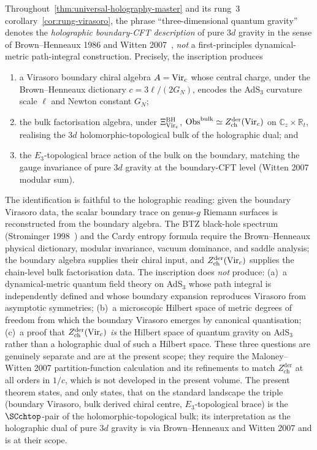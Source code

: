 \begin{remark}
Throughout~\cref{thm:universal-holography-master} and its
rung~3 corollary~\cref{cor:rung-virasoro}, the phrase
``three-dimensional quantum gravity'' denotes the
\emph{holographic boundary-CFT description} of pure $3d$
gravity in the sense of Brown--Henneaux 1986
\cite{BrownHenneaux} and Witten 2007~\cite{Witten2007},
\emph{not} a first-principles dynamical-metric path-integral
construction. Precisely, the inscription produces
\begin{enumerate}
\item[(i)] a Virasoro boundary chiral algebra
 $A = \mathrm{Vir}_{c}$ whose central charge, under the
 Brown--Henneaux dictionary $c = 3\ell/(2G_{N})$, encodes the
 AdS$_{3}$ curvature scale $\ell$ and Newton constant $G_{N}$;
\item[(ii)] the bulk factorisation algebra, under
 \(\Xi_{\mathrm{Vir}_c}^{\mathrm{BH}}\),
 $\mathrm{Obs}^{\mathrm{bulk}} \simeq
 Z^{\mathrm{der}}_{\mathrm{ch}}(\mathrm{Vir}_{c})$ on
 $\mathbb{C}_{z} \times \mathbb{R}_{t}$, realising the
 $3d$ holomorphic-topological bulk of the holographic dual; and
\item[(iii)] the $E_{3}$-topological brace action of the bulk
 on the boundary, matching the gauge invariance of pure $3d$
 gravity at the boundary-CFT level (Witten 2007 modular sum).
\end{enumerate}
The identification is faithful to the holographic reading:
given the boundary Virasoro data, the scalar boundary trace on
genus-$g$ Riemann surfaces is reconstructed from the boundary
algebra. The BTZ black-hole spectrum
(Strominger 1998~\cite{StromingerBTZ}) and the Cardy entropy
formula require the Brown--Henneaux physical dictionary, modular
invariance, vacuum dominance, and saddle analysis; the boundary
algebra supplies their chiral input, and
$Z^{\mathrm{der}}_{\mathrm{ch}}(\mathrm{Vir}_{c})$ supplies the
chain-level bulk factorisation data. The inscription does
\emph{not} produce: (a)~a dynamical-metric quantum field
theory on AdS$_{3}$ whose path integral is independently
defined and whose boundary expansion reproduces Virasoro from
asymptotic symmetries; (b)~a microscopic Hilbert space of
metric degrees of freedom from which the boundary Virasoro
emerges by canonical quantisation; (c)~a proof that
$Z^{\mathrm{der}}_{\mathrm{ch}}(\mathrm{Vir}_{c})$ \emph{is} the
Hilbert space of quantum gravity on AdS$_{3}$ rather than a
holographic dual of such a Hilbert space. These three
questions are genuinely separate and are
\ClaimStatusConjectured at the present scope; they require
the Maloney--Witten 2007 partition-function calculation and
its refinements to match $Z^{\mathrm{der}}_{\mathrm{ch}}$ at
all orders in $1/c$, which is not developed in the present
volume. The present theorem states, and only states, that on
the standard landscape the triple (boundary Virasoro, bulk
derived chiral centre, $E_{3}$-topological brace) is the
$\SCchtop$-pair of the holomorphic-topological bulk; its
interpretation as the holographic dual of pure $3d$ gravity is
via Brown--Henneaux and Witten 2007 and is at their scope.
\end{remark}

